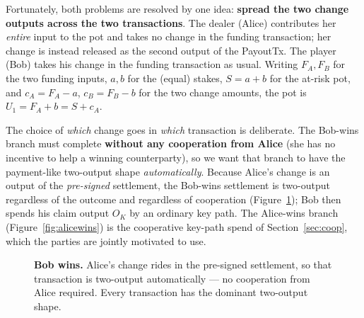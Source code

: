\documentclass[11pt]{article}
\begin{document}
Fortunately, both problems are resolved by one idea: \textbf{spread the two change outputs across the two transactions}. The dealer (Alice) contributes her \emph{entire} input to the pot and takes no change in the funding transaction; her change is instead released as the second output of the PayoutTx. The player (Bob) takes his change in the funding transaction as usual. Writing $F_A, F_B$ for the two funding inputs, $a,b$ for the (equal) stakes, $S = a+b$ for the at-risk pot, and $c_A = F_A - a$, $c_B = F_B - b$ for the two change amounts, the pot is $U_1 = F_A + b = S + c_A$.

The choice of \emph{which} change goes in \emph{which} transaction is deliberate. The Bob-wins branch must complete \textbf{without any cooperation from Alice} (she has no incentive to help a winning counterparty), so we want that branch to have the payment-like two-output shape \emph{automatically}. Because Alice's change is an output of the \emph{pre-signed} settlement, the Bob-wins settlement is two-output regardless of the outcome and regardless of cooperation (Figure~\ref{fig:bobwins}); Bob then spends his claim output $O_K$ by an ordinary key path. The Alice-wins branch (Figure~\ref{fig:alicewins}) is the cooperative key-path spend of Section~\ref{sec:coop}, which the parties are jointly motivated to use.

\begin{figure}[h]
\centering
{}
\caption{\textbf{Bob wins.} Alice's change rides in the pre-signed settlement, so that transaction is two-output automatically --- no cooperation from Alice required. Every transaction has the dominant two-output shape.}
\label{fig:bobwins}
\end{figure}
\end{document}

